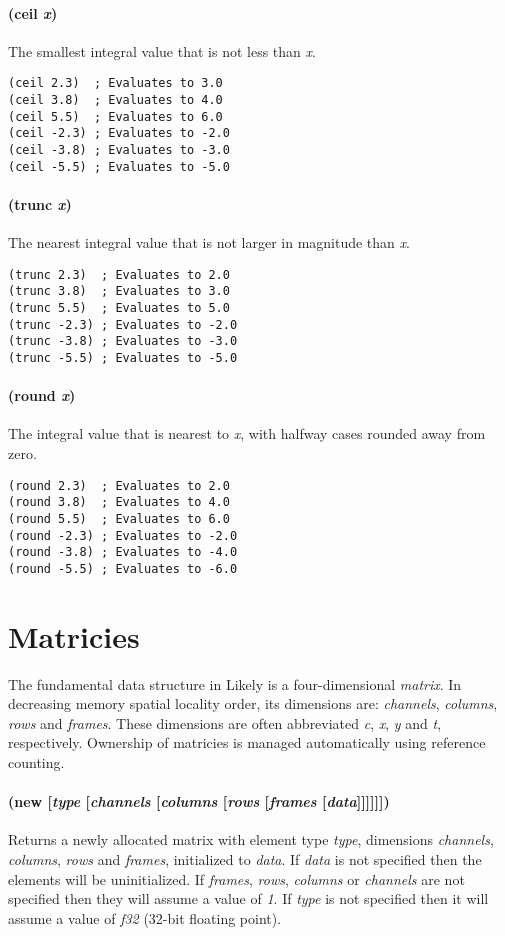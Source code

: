 \documentclass[twoside=false, numbers=noenddot]{scrbook}
\begin{document}
\paragraph{(ceil \emph{x})}
The smallest integral value that is not less than \emph{x}.

\begin{verbatim}
(ceil 2.3)  ; Evaluates to 3.0
(ceil 3.8)  ; Evaluates to 4.0
(ceil 5.5)  ; Evaluates to 6.0
(ceil -2.3) ; Evaluates to -2.0
(ceil -3.8) ; Evaluates to -3.0
(ceil -5.5) ; Evaluates to -5.0
\end{verbatim}

\paragraph{(trunc \emph{x})}
The nearest integral value that is not larger in magnitude than \emph{x}.

\begin{verbatim}
(trunc 2.3)  ; Evaluates to 2.0
(trunc 3.8)  ; Evaluates to 3.0
(trunc 5.5)  ; Evaluates to 5.0
(trunc -2.3) ; Evaluates to -2.0
(trunc -3.8) ; Evaluates to -3.0
(trunc -5.5) ; Evaluates to -5.0
\end{verbatim}

\paragraph{(round \emph{x})}
The integral value that is nearest to \emph{x}, with halfway cases rounded away from zero.

\begin{verbatim}
(round 2.3)  ; Evaluates to 2.0
(round 3.8)  ; Evaluates to 4.0
(round 5.5)  ; Evaluates to 6.0
(round -2.3) ; Evaluates to -2.0
(round -3.8) ; Evaluates to -4.0
(round -5.5) ; Evaluates to -6.0
\end{verbatim}

\section{Matricies}
The fundamental data structure in Likely is a four-dimensional \emph{matrix}.
In decreasing memory spatial locality order, its dimensions are: \emph{channels}, \emph{columns}, \emph{rows} and \emph{frames}.
These dimensions are often abbreviated \emph{c}, \emph{x}, \emph{y} and \emph{t}, respectively.
Ownership of matricies is managed automatically using reference counting.

\paragraph{(new [\emph{type} [\emph{channels} [\emph{columns} [\emph{rows} [\emph{frames} [\emph{data}]]]]]])}
Returns a newly allocated matrix with element type \emph{type}, dimensions \emph{channels}, \emph{columns}, \emph{rows} and \emph{frames}, initialized to \emph{data}.
If \emph{data} is not specified then the elements will be uninitialized.
If \emph{frames}, \emph{rows}, \emph{columns} or \emph{channels} are not specified then they will assume a value of \emph{1}.
If \emph{type} is not specified then it will assume a value of \emph{f32} (32-bit floating point).
\end{document}
